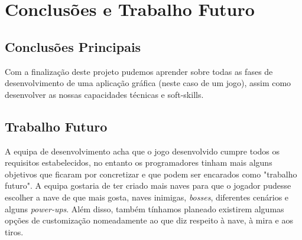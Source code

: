 \chapter{Conclusões e Trabalho Futuro}
\label{chap:conc-trab-futuro}

\section{Conclusões Principais}
\label{sec:conc-princ}

Com a finalização deste projeto pudemos aprender sobre todas as fases de desenvolvimento de uma aplicação gráfica (neste caso de um jogo), assim como desenvolver as nossas capacidades técnicas e soft-skills.

\section{Trabalho Futuro}
\label{sec:trab-futuro}
A equipa de desenvolvimento acha que o jogo desenvolvido cumpre todos os requisitos estabelecidos, no entanto os programadores tinham mais alguns objetivos que ficaram por concretizar e que podem ser encarados como "trabalho futuro". A equipa gostaria de ter criado mais naves para que o jogador pudesse escolher a nave de que mais gosta, naves inimigas, \emph{bosses}, diferentes cenários e alguns \emph{power-ups}. Além disso, também tínhamos planeado existirem algumas opções de customização nomeadamente ao que diz respeito à nave, à mira e aos tiros.